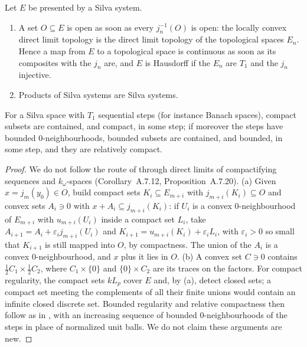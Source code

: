 \begin{theorem}
  \label{thm:ds-silva}
  \leanok
  Let $E$ be presented by a Silva system.
  \begin{enumerate}
    \item A set $O \subseteq E$ is open as soon as every $j_n^{-1}(O)$ is open: the locally convex
      direct limit topology is the direct limit topology of the topological spaces $E_n$. Hence a
      map from $E$ to a topological space is continuous as soon as its composites with the $j_n$
      are, and $E$ is Hausdorff if the $E_n$ are $T_1$ and the $j_n$ injective.
    \item Products of Silva systems are Silva systems.
  \end{enumerate}
  For a Silva space with $T_1$ sequential steps (for instance Banach spaces), compact subsets are
  contained, and compact, in some step; if moreover the steps have bounded $0$-neighbourhoods,
  bounded subsets are contained, and bounded, in some step, and they are relatively compact.
\end{theorem}

\begin{proof}
  \leanok
  We do not follow the route of \cite{GN26} through direct limits of compactifying sequences and
  $k_\omega$-spaces (Corollary~A.7.12, Proposition~A.7.20). (a) Given $x = j_m(y_0) \in O$, build
  compact sets $K_i \subseteq E_{m+i}$ with $j_{m+i}(K_i) \subseteq O$ and convex sets $A_i \ni 0$
  with $x + A_i \subseteq j_{m+i}(K_i)$: if $U_i$ is a convex $0$-neighbourhood of $E_{m+i}$ with
  $u_{m+i}(U_i)$ inside a compact set $L_i$, take $A_{i+1} = A_i + \varepsilon_i j_{m+i}(U_i)$ and
  $K_{i+1} = u_{m+i}(K_i) + \varepsilon_i L_i$, with $\varepsilon_i > 0$ so small that $K_{i+1}$
  is still mapped into $O$, by compactness. The union of the $A_i$ is a convex
  $0$-neighbourhood, and $x$ plus it lies in $O$. (b) A convex set $C \ni 0$ contains
  $\tfrac12 C_1 \times \tfrac12 C_2$, where $C_1 \times \{0\}$ and $\{0\} \times C_2$ are its
  traces on the factors. For compact regularity, the compact sets $k L_p$ cover $E$ and, by (a),
  detect closed sets; a compact set meeting the complements of all their finite unions would
  contain an infinite closed discrete set. Bounded regularity and relative compactness then follow
  as in \cite{GN26}, with an increasing sequence of bounded $0$-neighbourhoods of the steps in
  place of normalized unit balls. We do not claim these arguments are new.
\end{proof}

